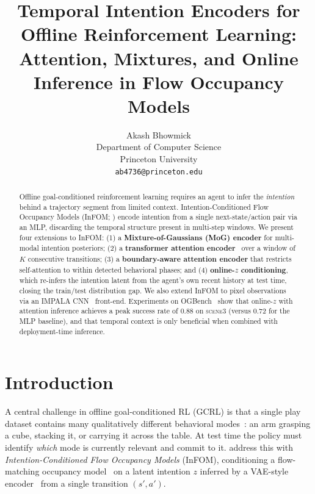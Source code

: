 \documentclass{article}
\title{Temporal Intention Encoders for Offline Reinforcement Learning:\\
Attention, Mixtures, and Online Inference in Flow Occupancy Models}
\author{
  Akash Bhowmick\\
  Department of Computer Science\\
  Princeton University\\
  \texttt{ab4736@princeton.edu}
}
\newcommand{\base}{InFOM}
\begin{document}
\maketitle

\begin{abstract}
Offline goal-conditioned reinforcement learning requires an agent to infer
the \emph{intention} behind a trajectory segment from limited context.
Intention-Conditioned Flow Occupancy Models (\base{}; \citet{zheng2025infom})
encode intention from a single next-state/action pair via an MLP,
discarding the temporal structure present in multi-step windows.
We present four extensions to \base{}:
(1) a \textbf{Mixture-of-Gaussians (MoG) encoder} for multi-modal intention posteriors;
(2) a \textbf{transformer attention encoder}~\citep{vaswani2017attention}
over a window of $K$ consecutive transitions;
(3) a \textbf{boundary-aware attention encoder} that restricts
self-attention to within detected behavioral phases;
and (4) \textbf{online-$z$ conditioning}, which re-infers the intention
latent from the agent's own recent history at test time, closing the
train/test distribution gap.
We also extend \base{} to pixel observations via an IMPALA
CNN~\citep{espeholt2018impala} front-end.
Experiments on OGBench~\citep{park2025ogbenchbenchmarkingofflinegoalconditioned} show that online-$z$
with attention inference achieves a peak success rate of $0.88$ on
\textsc{scene3} (versus $0.72$ for the MLP baseline),
and that temporal context is only beneficial when combined with
deployment-time inference.
\end{abstract}


\section{Introduction}
\label{sec:intro}

A central challenge in offline goal-conditioned RL (GCRL) is that a single
play dataset contains many qualitatively different behavioral
modes~\citep{park2025ogbenchbenchmarkingofflinegoalconditioned,ghosh2023passive}: an arm grasping a cube,
stacking it, or carrying it across the table.
At test time the policy must identify \emph{which} mode is currently
relevant and commit to it.
\citet{zheng2025infom} address this with
\emph{Intention-Conditioned Flow Occupancy Models} (\base{}),
conditioning a flow-matching occupancy model~\citep{lipman2023flow,farebrother2025tdflows}
on a latent intention $z$ inferred by a VAE-style
encoder~\citep{kingma2013vae} from a single transition $(s',a')$.
\end{document}
